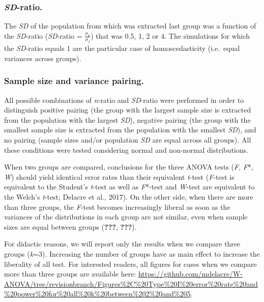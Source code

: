 \documentclass[man,floatsintext]{apa6}
\begin{document}
\subsubsection{\texorpdfstring{\emph{SD}-ratio.}{SD-ratio.}}\label{sd-ratio.}

The \emph{SD} of the population from which was extracted last group was
a function of the \emph{SD}-ratio (\emph{SD}-ratio =
\(\frac{\sigma_k}{\sigma_j}\)) that was 0.5, 1, 2 or 4. The simulations
for which the \emph{SD}-ratio equals 1 are the particular case of
homoscedasticity (i.e.~equal variances across groups).

\subsubsection{Sample size and variance
pairing.}\label{sample-size-and-variance-pairing.}

All possible combinations of \emph{n}-ratio and \emph{SD}-ratio were
performed in order to distinguish positive pairing (the group with the
largest sample size is extracted from the population with the largest
\emph{SD}), negative pairing (the group with the smallest sample size is
extracted from the population with the smallest \emph{SD}), and no
pairing (sample sizes and/or population \emph{SD} are equal across all
groups). All these conditions were tested considering normal and
non-normal distributions.

When two groups are compared, conclusions for the three ANOVA tests
(\emph{F}, \emph{F}*, \emph{W}) should yield identical error rates than
their equivalent \emph{t}-test (\emph{F}-test is equivalent to the
Student's \emph{t}-test as well as \emph{F}*-test and \emph{W}-test are
equivalent to the Welch's \emph{t}-test; Delacre et al., 2017). On the
other side, when there are more than three groups, the \emph{F}-test
becomes increasingly liberal as soon as the variances of the
distributions in each group are not similar, even when sample sizes are
equal between groups ({\textbf{???}}, {\textbf{???}}).

For didactic reasons, we will report only the results when we compare
three groups (\emph{k}=3). Increasing the number of groups have as main
effect to increase the liberality of all test. For interested readers,
all figures for cases when we compare more than three groups are
available here:
\url{https://github.com/mdelacre/W-ANOVA/tree/revisionbranch/Figures\%2C\%20Type\%20I\%20error\%20rate\%20and\%20power\%20for\%20all\%20k\%20between\%202\%20and\%205}.
\end{document}
